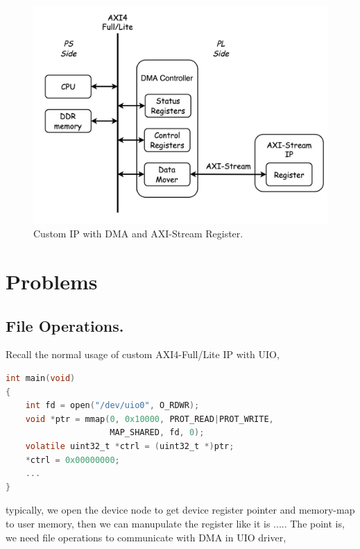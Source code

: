 \begin{figure}[!htb]
  \centering
  \includegraphics[scale=0.3]{images/customStreamIP.jpg}
  \caption[Custom IP with DMA and AXI-Stream Register.]{Custom IP with DMA and AXI-Stream Register.}
  \label{fig:Custom IP with DMA and AXI-Stream Register.}
\end{figure}
\section{Problems}
\label{sec:Problems}

\subsection{File Operations.}
\label{subsec:File Operations}
Recall the normal usage of custom AXI4-Full/Lite IP with UIO,
\begin{lstlisting}[frame=single,language=C]
int main(void)
{
    int fd = open("/dev/uio0", O_RDWR);
    void *ptr = mmap(0, 0x10000, PROT_READ|PROT_WRITE, 
                     MAP_SHARED, fd, 0);
    volatile uint32_t *ctrl = (uint32_t *)ptr;
    *ctrl = 0x00000000;
    ...
}
\end{lstlisting}
typically, we open the device node to get device register pointer and memory-map to user memory, then we can manupulate the register like it is ..... The point is, we need file operations to communicate with DMA in UIO driver, 

